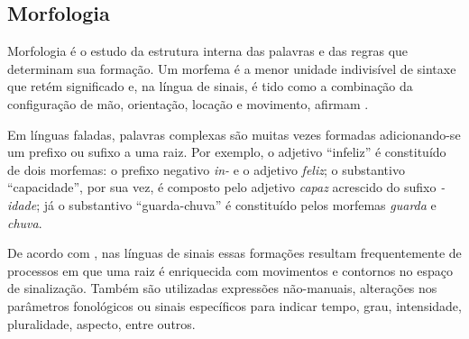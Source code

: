 \subsection{Morfologia}
\label{sec:linguistica-morfologia}

Morfologia é o estudo da estrutura interna das palavras e das regras que determinam sua formação. Um morfema é a menor unidade indivisível de sintaxe que retém significado e, na língua de sinais, é tido como a combinação da configuração de mão, orientação, locação e movimento, afirmam .



Em línguas faladas, palavras complexas são muitas vezes formadas adicionando-se um prefixo ou sufixo a uma raiz. Por exemplo, o adjetivo ``infeliz'' é constituído de dois morfemas: o prefixo negativo \textit{in-} e o adjetivo \textit{feliz}; o substantivo ``capacidade'', por sua vez, é composto pelo adjetivo \textit{capaz} acrescido do sufixo \textit{-idade}; já o substantivo ``guarda-chuva'' é constituído pelos morfemas \textit{guarda} e \textit{chuva}.



De acordo com , nas línguas de sinais essas formações resultam frequentemente de processos em que uma raiz é enriquecida com movimentos e contornos no espaço de sinalização. Também são utilizadas expressões não-manuais, alterações nos parâmetros fonológicos ou sinais específicos para indicar tempo, grau, intensidade, pluralidade, aspecto, entre outros.

